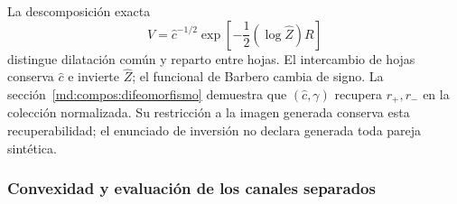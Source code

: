 La descomposición exacta
\begin{equation}
 V=\widehat c^{-1/2}
 \exp\!\left[-\frac12(\log\widehat Z)R\right]
 \label{md:hib:descomposicion-v}
\end{equation}
distingue dilatación común y reparto entre hojas. El intercambio de hojas
conserva $\widehat c$ e invierte $\widehat Z$; el funcional de Barbero cambia
de signo. La sección~\ref{md:compos:difeomorfismo} demuestra que
$(\widehat c,\gamma)$ recupera $r_+,r_-$ en la colección normalizada.
Su restricción a la imagen generada conserva esta recuperabilidad; el
enunciado de inversión no declara generada toda pareja sintética.

\subsubsection{Convexidad y evaluación de los canales separados}
\label{md:hib:convexidad}

